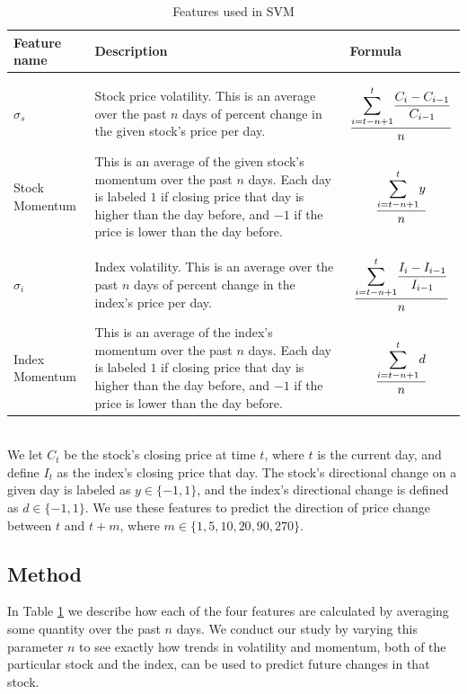 \documentclass[pageno]{jpaper}
\begin{document}
\begin{table}%
\caption{Features used in SVM} \label{table: features}
\small
\begin{tabular}{p{3cm} p{6cm} p{6cm}}
\hline
Feature name & Description & Formula \\
\hline \\
$ \sigma_s$ & Stock price volatility. This is an average over the past $n$ days of percent change in the given stock's price per day. & $$\dfrac{\mathlarger{\sum}_{i=t-n+1}^t \dfrac{C_i - C_{i-1}}{C_{i-1}}}{n}$$ \\
Stock Momentum & This is an average of the given stock's momentum over the past $n$ days. Each day is labeled $1$ if closing price that day is higher than the day before, and $-1$ if the price is lower than the day before. & $$\dfrac{\mathlarger{\sum}_{i=t-n+1}^t y}{n}$$ \\ \\
$\sigma_i$ & Index volatility. This is an average over the past $n$ days of percent change in the index's price per day. & $$\dfrac{\mathlarger{\sum}_{i=t-n+1}^t \dfrac{I_i - I_{i-1}}{I_{i-1}}}{n}$$ \\ 
Index Momentum & This is an average of the index's momentum over the past $n$ days. Each day is labeled $1$ if closing price that day is higher than the day before, and $-1$ if the price is lower than the day before. & $$\dfrac{\mathlarger{\sum}_{i=t-n+1}^t d}{n}$$ \\ \hline
\end{tabular}
\footnotesize
\\We let $C_t$ be the stock's closing price at time $t$, where $t$ is the current day, and define $I_t$ as the index's closing price that day. The stock's directional change on a given day is labeled as $y \in \{-1, 1\}$, and the index's directional change is defined as $d \in \{-1, 1\}$. We use these features to predict the direction of price change between $t$ and $t + m$, where $m \in \{1, 5, 10, 20, 90, 270\}$.
\vspace{10pt}
\end{table}

\subsection{Method}
In Table \ref{table: features} we describe how each of the four features are calculated by averaging some quantity over the past $n$ days. We conduct our study by varying this parameter $n$ to see exactly how trends in volatility and momentum, both of the particular stock and the index, can be used to predict future changes in that stock.
\end{document}
